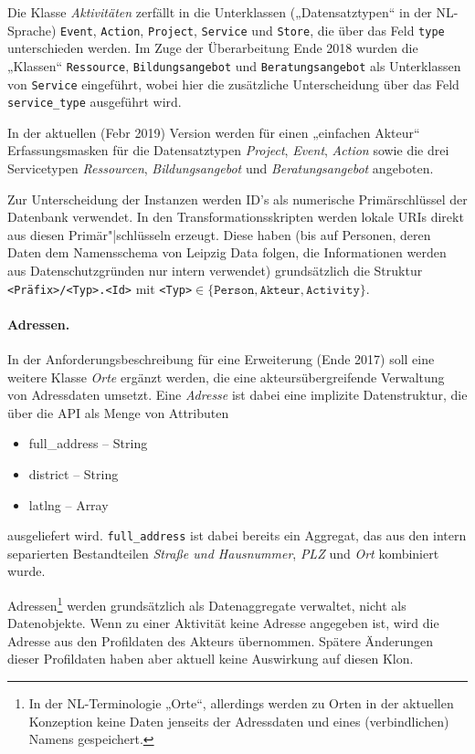 \documentclass[a4paper,11pt]{article}
\begin{document}
Die Klasse \emph{Aktivitäten} zerfällt in die Unterklassen („Datensatztypen“
in der NL-Sprache) \texttt{Event}, \texttt{Action}, \texttt{Project},
\texttt{Service} und \texttt{Store}, die über das Feld \texttt{type}
unterschieden werden. Im Zuge der Überarbeitung Ende 2018 wurden die „Klassen“
\texttt{Ressource}, \texttt{Bildungsangebot} und \texttt{Beratungsangebot} als
Unterklassen von \texttt{Service} eingeführt, wobei hier die zusätzliche
Unterscheidung über das Feld \texttt{service\_type} ausgeführt wird.

In der aktuellen (Febr 2019) Version werden für einen „einfachen Akteur“
Erfassungsmasken für die Datensatztypen \emph{Project}, \emph{Event},
\emph{Action} sowie die drei Servicetypen \emph{Ressourcen},
\emph{Bildungsangebot} und \emph{Beratungsangebot} angeboten. 

Zur Unterscheidung der Instanzen werden ID's als numerische Primärschlüssel
der Datenbank verwendet. In den Transformationsskripten werden lokale URIs
direkt aus diesen Primär"|schlüsseln erzeugt. Diese haben (bis auf Personen,
deren Daten dem Namensschema von Leipzig Data folgen, die Informationen werden
aus Datenschutzgründen nur intern verwendet) grundsätzlich die Struktur
\texttt{<Präfix>/<Typ>.<Id>} mit \texttt{<Typ>}$\in \{\texttt{Person},
\texttt{Akteur}, \texttt{Activity}\}$.

\paragraph{Adressen.} 
In der Anforderungsbeschreibung für eine Erweiterung (Ende 2017) soll eine
weitere Klasse \emph{Orte} ergänzt werden, die eine akteursübergreifende
Verwaltung von Adressdaten umsetzt. Eine \emph{Adresse} ist dabei eine
implizite Datenstruktur, die über die API als Menge von Attributen
\begin{itemize}
  \item full\_address -- String
  \item district -- String
  \item latlng -- Array
\end{itemize}
ausgeliefert wird. \texttt{full\_address} ist dabei bereits ein Aggregat, das
aus den intern separierten Bestandteilen \emph{Straße und Hausnummer},
\emph{PLZ} und \emph{Ort} kombiniert wurde.

Adressen\footnote{In der NL-Terminologie „Orte“, allerdings werden zu Orten in
  der aktuellen Konzeption keine Daten jenseits der Adressdaten und eines
  (verbindlichen) Namens gespeichert.} werden grundsätzlich als Datenaggregate
verwaltet, nicht als Datenobjekte.  Wenn zu einer Aktivität keine Adresse
angegeben ist, wird die Adresse aus den Profildaten des Akteurs übernommen.
Spätere Änderungen dieser Profildaten haben aber aktuell keine Auswirkung auf
diesen Klon.
\end{document}
